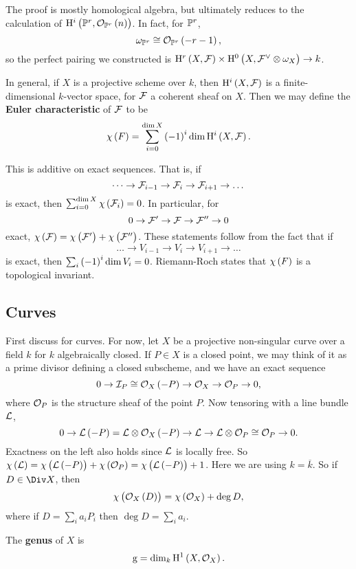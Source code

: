 The proof is mostly homological algebra, but ultimately reduces to the calculation of $ \H^i\br{\PP^r, \OOO_{\PP^r}\br{n}} $. In fact, for $ \mathbb{P}^r $,
$$ \omega_{\PP^r} \cong \OOO_{\PP^r}\br{-r - 1}, $$
so the perfect pairing we constructed is $ \H^r\br{X, \FFF} \times \H^0\br{X, \FFF^\vee \otimes \omega_X} \to k $.

\begin{definition*}
In general, if $ X $ is a projective scheme over $ k $, then $ \H^i\br{X, \FFF} $ is a finite-dimensional $ k $-vector space, for $ \mathcal{F} $ a coherent sheaf on $ X $. Then we may define the \textbf{Euler characteristic} of $ \mathcal{F} $ to be
$$ \chi\br{F} = \sum_{i = 0}^{\dim X} \br{-1}^i\dim \H^i\br{X, \FFF}. $$
\end{definition*}

This is additive on exact sequences. That is, if
$$ \dots \to \mathcal{F}_{i - 1} \to \mathcal{F}_i \to \mathcal{F}_{i + 1} \to \dots $$
is exact, then $ \sum_{i = 0}^{\dim X} \chi\br{\FFF_i} = 0 $. In particular, for
$$ 0 \to \mathcal{F}' \to \mathcal{F} \to \mathcal{F}'' \to 0 $$
exact, $ \chi\br{\FFF} = \chi\br{\FFF'} + \chi\br{\FFF''} $. These statements follow from the fact that if
$$ \dots \to V_{i - 1} \to V_i \to V_{i + 1} \to \dots $$
is exact, then $ \sum_i \br{-1}^i \dim V_i = 0 $. Riemann-Roch states that $ \chi\br{F} $ is a topological invariant.

\pagebreak

\subsection{Curves}

First discuss for curves. For now, let $ X $ be a projective non-singular curve over a field $ k $ for $ k $ algebraically closed. If $ P \in X $ is a closed point, we may think of it as a prime divisor defining a closed subscheme, and we have an exact sequence
$$ 0 \to \III_P \cong \OOO_X\br{-P} \to \OOO_X \to \OOO_P \to 0, $$
where $ \mathcal{O}_P $ is the structure sheaf of the point $ P $. Now tensoring with a line bundle $ \mathcal{L} $,
$$ 0 \to \LLL\br{-P} = \LLL \otimes \OOO_X\br{-P} \to \LLL \to \LLL \otimes \OOO_P \cong \OOO_P \to 0. $$
Exactness on the left also holds since $ \mathcal{L} $ is locally free. So $ \chi\br{\LLL} = \chi\br{\LLL\br{-P}} + \chi\br{\OOO_P} = \chi\br{\LLL\br{-P}} + 1 $. Here we are using $ k = \overline{k} $. So if $ D \in \Div X $, then
$$ \chi\br{\OOO_X\br{D}} = \chi\br{\OOO_X} + \deg D, $$
where if $ D = \sum_i a_iP_i $ then $ \deg D = \sum_i a_i $.

\begin{definition*}
The \textbf{genus} of $ X $ is
$$ \g = \dim_k \H^1\br{X, \OOO_X}. $$
\end{definition*}


